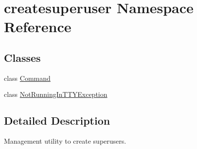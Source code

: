 \hypertarget{namespacecreatesuperuser}{}\section{createsuperuser Namespace Reference}
\label{namespacecreatesuperuser}
\subsection*{Classes}
\begin{DoxyCompactItemize}
\item 
class \mbox{\hyperlink{classcreatesuperuser_1_1_command}{Command}}
\item 
class \mbox{\hyperlink{classcreatesuperuser_1_1_not_running_in_t_t_y_exception}{Not\+Running\+In\+T\+T\+Y\+Exception}}
\end{DoxyCompactItemize}


\subsection{Detailed Description}
\begin{DoxyVerb}Management utility to create superusers.
\end{DoxyVerb}
 